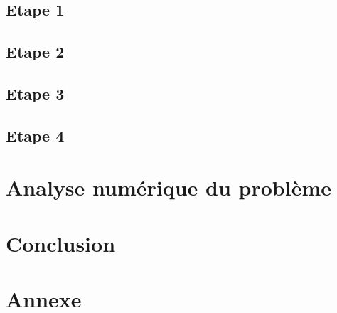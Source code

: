 \documentclass[12,french]{report}
\begin{document}
\section{Etape 1}

\section{Etape 2}

\section{Etape 3}

\section{Etape 4}

\chapter{Analyse numérique du problème} %

\chapter*{Conclusion} %

\chapter*{Annexe}
\end{document}
